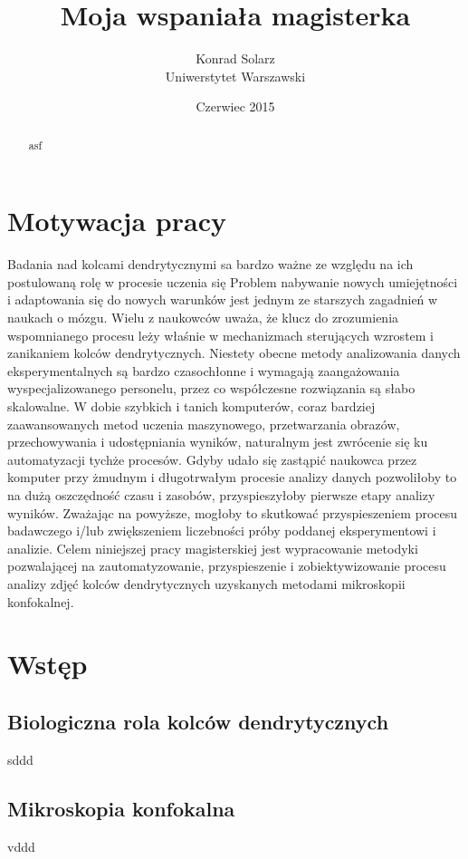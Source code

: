 \documentclass{article}
\begin{document}
\title{Moja wspaniała magisterka}
\author{Konrad Solarz\\Uniwerstytet Warszawski}
\date{Czerwiec 2015}
\maketitle
\clearpage
\begin{abstract}
asf

\end{abstract}
\clearpage

\tableofcontents
\clearpage

\section{Motywacja pracy}
Badania nad kolcami dendrytycznymi sa bardzo ważne ze względu na ich postulowaną rolę w procesie uczenia się %
Problem nabywanie nowych umiejętności i adaptowania się do nowych warunków jest jednym ze starszych zagadnień w naukach o mózgu.
Wielu z naukowców uważa, że klucz do zrozumienia wspomnianego procesu leży właśnie w mechanizmach sterujących wzrostem i zanikaniem kolców dendrytycznych.
Niestety obecne metody analizowania danych eksperymentalnych są bardzo czasochłonne i wymagają zaangażowania wyspecjalizowanego personelu, przez co współczesne rozwiązania są słabo skalowalne.
W dobie szybkich i tanich komputerów, coraz bardziej zaawansowanych metod uczenia maszynowego, przetwarzania obrazów, przechowywania i udostępniania wyników, naturalnym jest zwrócenie się ku automatyzacji tychże procesów.
Gdyby udało się zastąpić naukowca przez komputer przy żmudnym i długotrwałym procesie analizy danych pozwoliłoby to na dużą oszczędność czasu i zasobów, przyspieszyłoby pierwsze etapy analizy wyników.
Zważając na powyższe, mogłoby to skutkować przyspieszeniem procesu badawczego i/lub zwiększeniem liczebności próby poddanej eksperymentowi i analizie.
Celem niniejszej pracy magisterskiej jest wypracowanie metodyki pozwalającej na zautomatyzowanie, przyspieszenie i zobiektywizowanie procesu analizy zdjęć kolców dendrytycznych uzyskanych metodami mikroskopii konfokalnej.



\section{Wstęp}

\subsection{Biologiczna rola kolców dendrytycznych}
sddd

\subsection{Mikroskopia konfokalna}
vddd
\end{document}
